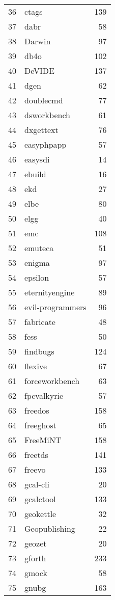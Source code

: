 \begin{table}[!ht]
\begin{tabular}{rlr}
  36 & ctags & 139 \\ 
  37 & dabr &  58 \\ 
  38 & Darwin &  97 \\ 
  39 & db4o & 102 \\ 
  40 & DeVIDE & 137 \\ 
  41 & dgen &  62 \\ 
  42 & doublecmd &  77 \\ 
  43 & dsworkbench &  61 \\ 
  44 & dxgettext &  76 \\ 
  45 & easyphpapp &  57 \\ 
  46 & easysdi &  14 \\ 
  47 & ebuild &  16 \\ 
  48 & ekd &  27 \\ 
  49 & elbe &  80 \\ 
  50 & elgg &  40 \\ 
  51 & emc & 108 \\ 
  52 & emuteca &  51 \\ 
  53 & enigma &  97 \\ 
  54 & epsilon &  57 \\ 
  55 & eternityengine &  89 \\ 
  56 & evil-programmers &  96 \\ 
  57 & fabricate &  48 \\ 
  58 & fess &  50 \\ 
  59 & findbugs & 124 \\ 
  60 & flexive &  67 \\ 
  61 & forceworkbench &  63 \\ 
  62 & fpcvalkyrie &  57 \\ 
  63 & freedos & 158 \\ 
  64 & freeghost &  65 \\ 
  65 & FreeMiNT & 158 \\ 
  66 & freetds & 141 \\ 
  67 & freevo & 133 \\ 
  68 & gcal-cli &  20 \\ 
  69 & gcalctool & 133 \\ 
  70 & geokettle &  32 \\ 
  71 & Geopublishing &  22 \\ 
  72 & geozet &  20 \\ 
  73 & gforth & 233 \\ 
  74 & gmock &  58 \\ 
  75 & gnubg & 163 \\ 

\end{tabular}
\end{table}
